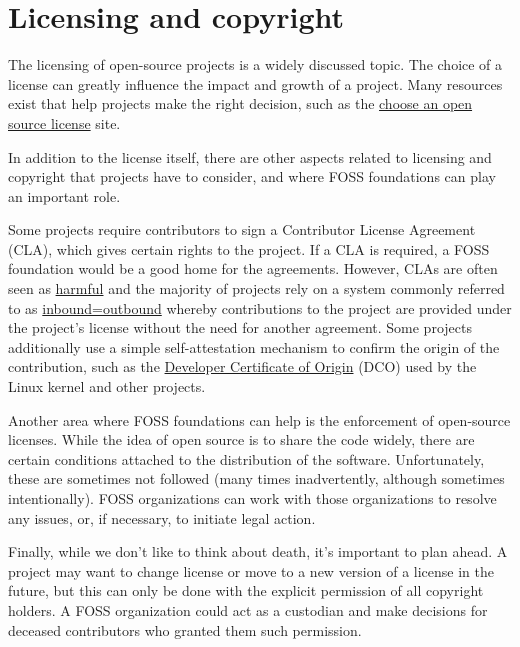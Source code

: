 


\chapter{Licensing and copyright}

The licensing of open-source projects is a widely discussed topic.  The choice of a license can greatly influence the impact and growth of a project.  Many resources exist that help projects make the right decision, such as the \href{https://choosealicense.com/}{choose an open source license} site.

In addition to the license itself, there are other aspects related to licensing and copyright that projects have to consider, and where FOSS foundations can play an important role.

Some projects require contributors to sign a Contributor License Agreement (CLA), which gives certain rights to the project.  If a CLA is required, a FOSS foundation would be a good home for the agreements.  However, CLAs are often seen as \href{https://opensource.com/article/19/2/cla-problems}{harmful} and the majority of projects rely on a system commonly referred to as \href{https://opensource.com/law/11/7/trouble-harmony-part-1}{inbound=outbound} whereby contributions to the project are provided under the project's license without the need for another agreement.  Some projects additionally use a simple self-attestation mechanism to confirm the origin of the contribution, such as the \href{https://developercertificate.org/}{Developer Certificate of Origin} (DCO) used by the Linux kernel and other projects.

Another area where FOSS foundations can help is the enforcement of open-source licenses.  While the idea of open source is to share the code widely, there are certain conditions attached to the distribution of the software.  Unfortunately, these are sometimes not followed (many times inadvertently, although sometimes intentionally).  FOSS organizations can work with those organizations to resolve any issues, or, if necessary, to initiate legal action.

Finally, while we don't like to think about death, it's important to plan ahead.  A project may want to change license or move to a new version of a license in the future, but this can only be done with the explicit permission of all copyright holders.  A FOSS organization could act as a custodian and make decisions for deceased contributors who granted them such permission.

